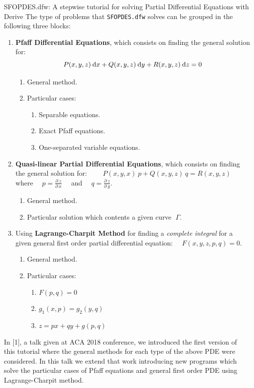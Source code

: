 \begin{abstract_online}{SFOPDES.dfw: A stepwise tutorial for solving Partial Differential Equations with {\sc Derive}}
The type of problems that {\tt SFOPDES.dfw} solves can be grouped in the following three blocks:
\begin{enumerate}
\item {\bf Pfaff Differential Equations}, which consists on finding the general solution for:
$$
P(x,y,z)\:{\rm d}x + Q(x,y,z)\:{\rm d}y + R(x,y,z)\:{\rm d}z = 0
$$
\begin{enumerate}
\item General method.
\item Particular cases:
\begin{enumerate}\item Separable equations.
\item Exact Pfaff equations.
\item One-separated variable equations.
\end{enumerate}
\end{enumerate}
\item {\bf Quasi-linear Partial Differential Equations}, which consists on finding the general solution for:
$\qquad\displaystyle
P(x,y,x)\:p + Q(x,y,z)\:q = R(x,y,z)
\qquad$
where $\displaystyle \quad p=\frac{\partial\: z}{\partial\: x}\quad$ and $\displaystyle \quad q=\frac{\partial\: z}{\partial\: y}$.
\begin{enumerate}
\item General method.
\item Particular solution which contents a given curve $\;\Gamma$. 
\end{enumerate}
\item Using {\bf Lagrange-Charpit Method} for finding a {\em complete integral} for a given general first order partial differential equation: $\quad F(x,y,z,p,q)=0$.
\begin{enumerate}
\item General method.
\item Particular cases: 
\begin{enumerate}
\item $F(p,q)=0$
\item $g_1(x,p) = g_2(y,q)$
\item $z=px+qy+g(p,q)$
\end{enumerate}
\end{enumerate}
\end{enumerate}
In [1], a talk given at ACA 2018 conference, we introduced the first version of this tutorial where the general methods for each type of the above PDE were considered. In this talk we extend that work introducing new programs which solve the particular cases of Pfaff equations and general first order PDE using Lagrange-Charpit method.


\end{abstract_online}
